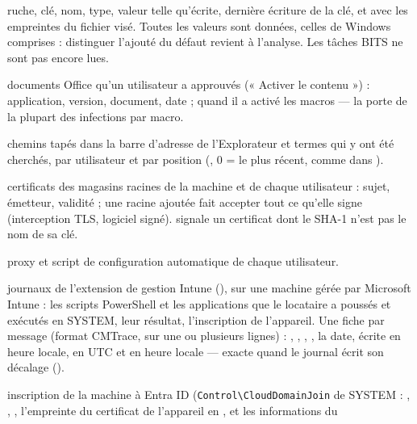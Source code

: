 \documentclass[11pt,a4paper,oneside]{report}
\begin{document}
\begin{description}[style=nextline,leftmargin=1.2em]
        ruche, clé, nom, type, valeur telle qu'écrite, dernière écriture de la
        clé, et avec  les empreintes du fichier visé. Toutes les
        valeurs sont données, celles de Windows comprises : distinguer
        l'ajouté du défaut revient à l'analyse. Les tâches BITS ne sont pas
        encore lues.
  \item[\fichier{office\_trust\_records.json}] documents Office qu'un utilisateur
        a approuvés (« Activer le contenu ») : application, version, document,
        date ;  quand il a activé les macros — la porte de
        la plupart des infections par macro.
  \item[\fichier{typed\_paths.json}, \fichier{word\_wheel\_query.json}] chemins
        tapés dans la barre d'adresse de l'Explorateur et termes qui y ont été
        cherchés, par utilisateur et par position (, 0 = le plus
        récent, comme dans ).
  \item[\fichier{root\_certificates.json}] certificats des magasins racines de la
        machine et de chaque utilisateur : sujet, émetteur, validité ; une
        racine ajoutée fait accepter tout ce qu'elle signe (interception TLS,
        logiciel signé).  signale un certificat dont le
        SHA-1 n'est pas le nom de sa clé.
  \item[\fichier{internet\_settings.json}] proxy et script de configuration
        automatique de chaque utilisateur.
  \item[\fichier{intune\_logs.json}] journaux de l'extension de gestion
        Intune (),
        sur une machine gérée par Microsoft Intune : les scripts PowerShell et
        les applications que le locataire a poussés et exécutés en SYSTEM,
        leur résultat, l'inscription de l'appareil. Une fiche par message
        (format CMTrace, sur une ou plusieurs lignes) : ,
        , , , la date, écrite en
        heure locale, en UTC et en heure locale — exacte quand le journal
        écrit son décalage ().
  \item[\fichier{cloud\_identity.json}] inscription de la machine à Entra ID
        (\texttt{Control\textbackslash CloudDomainJoin} de SYSTEM :
        , , , l'empreinte du
        certificat de l'appareil en , et les informations du

\end{description}
\end{document}
